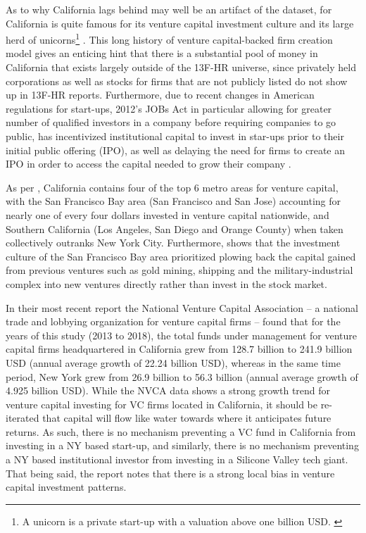 As to why California lags behind may well be an artifact of the dataset, for California is quite famous for its venture capital investment culture \citep{greenventure2004} and its large herd of unicorns\footnote{A unicorn is a private start-up with a valuation above one billion USD. \citep{Lee2013}} \citep{kenney2019unicorns}. This long history of venture capital-backed firm creation model gives an enticing hint that there is a substantial pool of money in California that exists largely outside of the 13F-HR universe, since privately held corporations as well as stocks for firms that are not publicly listed do not show up in 13F-HR reports.  Furthermore, due to recent changes in American regulations for start-ups, 2012's JOBs Act in particular allowing for greater number of qualified investors in a company before requiring companies to go public, has incentivized institutional capital to invest in star-ups prior to their initial public offering (IPO), as well as delaying the need for firms to create an IPO in order to access the capital needed to grow their company \citep{kenney2019unicorns}.


As per \cite{florida2016rise}, California contains four of the top 6 metro areas for venture capital, with the San Francisco Bay area (San Francisco and San Jose) accounting for nearly one of every four dollars invested in venture capital nationwide, and Southern California (Los Angeles, San Diego and Orange County) when taken collectively outranks New York City. Furthermore, \cite{adams2018diversified} shows that the investment culture of the San Francisco Bay area prioritized plowing back the capital gained from previous ventures such as gold mining, shipping and the military-industrial complex into new ventures directly rather than invest in the stock market. 

In their most recent report  the National Venture Capital Association\citeyearpar{NVCA2020} -- a national trade and lobbying organization for venture capital firms -- found that for the  years of this study (2013 to 2018), the total funds under management for venture capital firms headquartered in California grew from 128.7 billion to 241.9 billion USD (annual average growth of 22.24 billion USD), whereas in the same time period, New York grew from 26.9 billion to 56.3 billion (annual average growth of 4.925 billion USD). While the NVCA data shows a strong growth trend for venture capital investing for VC firms located in California, it should be re-iterated that capital will flow like water towards where it anticipates future returns.  As such, there is no mechanism preventing a VC fund in California from investing in a NY based start-up, and similarly, there is no mechanism preventing a NY based institutional investor from investing in a Silicone Valley tech giant. That being said, the report notes that there is a strong local bias in venture capital investment patterns. 


